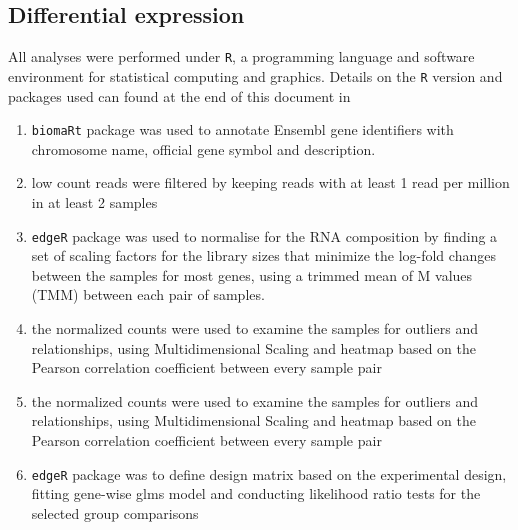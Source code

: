 \documentclass[12pt]{article}
\begin{document}
\subsection{Differential expression}
All analyses were performed under \texttt{R}, a programming language and software environment for statistical computing and graphics. Details on the \texttt{R} version and packages used can found at the end of this document in 
\begin{enumerate}
  \item \texttt{biomaRt} package was used to annotate Ensembl gene identifiers with chromosome name, official gene symbol and description. 
  \item low count reads were filtered by keeping reads with at least 1 read per million in at least 2 samples
  \item \texttt{edgeR} package was used to normalise for the RNA composition by finding a set of scaling factors for the library sizes that minimize the log-fold changes between the samples for most genes, using a trimmed mean of M values (TMM) between each pair of samples.
  \item the normalized counts were used to examine the samples for outliers and relationships, using Multidimensional Scaling and heatmap based on the Pearson correlation coefficient between every sample pair
    \item the normalized counts were used to examine the samples for outliers and relationships, using Multidimensional Scaling and heatmap based on the Pearson correlation coefficient between every sample pair
    \item \texttt{edgeR} package was to define design matrix based on the experimental design, fitting gene-wise glms model and conducting likelihood ratio tests for the selected group comparisons
\end{enumerate}
\end{document}
